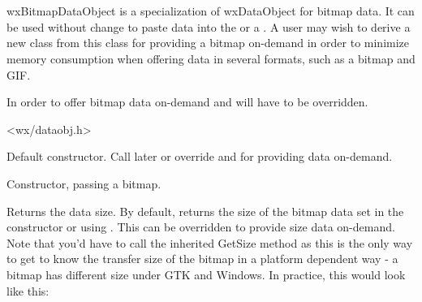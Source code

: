 \section{}\label{wxbitmapdataobject}

wxBitmapDataObject is a specialization of wxDataObject for bitmap data. It can be
used without change to paste data into the 
or a . A user may wish to derive a new class
from this class for providing a bitmap on-demand in order to minimize memory consumption
when offering data in several formats, such as a bitmap and GIF.

In order to offer bitmap data on-demand  
and  will have to be overridden.




<wx/dataobj.h>




\label{wxbitmapdataobjectwxbitmapdataobject}


Default constructor. Call  later
or override  and 
 for providing data on-demand.


Constructor, passing a bitmap.

\label{wxbitmapdataobjectgetsize}


Returns the data size. By default, returns the size of the bitmap data
set in the constructor or using .
This can be overridden to provide size data on-demand. Note that you'd
have to call the inherited GetSize method as this is the only way
to get to know the transfer size of the bitmap in a platform dependent
way - a bitmap has different size under GTK and Windows. In practice, 
this would look like this:

